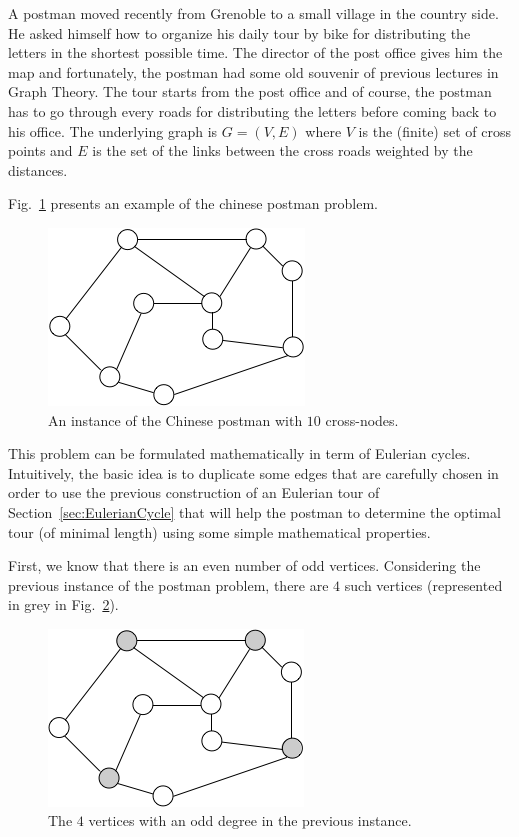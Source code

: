 {A postman moved recently from Grenoble to a small village in the country side. 
He asked himself how to organize his daily tour by bike for distributing the letters in the shortest possible time. 
The director of the post office gives him the map and 
fortunately, the postman had some old souvenir of previous lectures in Graph Theory.  
The tour starts from the post office and of course, the postman has to go through every roads for distributing the letters before coming back
to his office.
The underlying graph is $G=(V,E)$ where $V$ is the (finite) set of cross points and $E$ is the set of the links between the cross roads
weighted by the distances.  

Fig.~\ref{fig:EulerianInitial} presents an example of the chinese postman problem. 
\begin{figure}[hbt]
\begin{center}
       \includegraphics[scale=0.6]{FiguresGraph/EulerienInitial}
       \caption{An instance of the Chinese postman with $10$ cross-nodes.}
              \label{fig:EulerianInitial}
\end{center}
\end{figure}

\bigskip

This problem can be formulated mathematically in term of Eulerian
cycles.  Intuitively, the basic idea is to duplicate some edges that
are carefully chosen in order to use the previous construction of an
Eulerian tour of Section~\ref{sec:EulerianCycle} that will help the
postman to determine the optimal tour (of minimal length) using some
simple mathematical properties.
\bigskip

First, we know that there is an even number of odd vertices.
Considering the previous instance of the postman problem, there are $4$ such vertices (represented in grey in Fig.~\ref{fig:EulerianVodd}).

\begin{figure}[hbt]
\begin{center}
       \includegraphics[scale=0.6]{FiguresGraph/EulerienVodd}
       \caption{The $4$ vertices with an odd degree in the previous instance.}
              \label{fig:EulerianVodd}
\end{center}
\end{figure}
\bigskip

}
